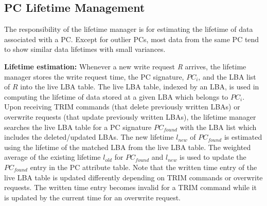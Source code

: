 

\vspace{-10pt}
\subsection{PC Lifetime Management}
\vspace{-5pt}
The responsibility of the lifetime manager is for estimating the lifetime of
data associated with a PC. 
{\color{blue}
Except for outlier PCs, most data from the same PC tend to show similar 
data lifetimes with small variances.
}

\textbf{Lifetime estimation:}
{\color{blue}
Whenever a new write request {\it R} arrives, 
the lifetime manager stores the write request time,
the PC signature, $PC_i$, and the LBA list of {$R$} into the live LBA table.
The live LBA table, indexed by an LBA, is used in computing the lifetime of data stored
at a given LBA which belongs to $PC_i$.
Upon receiving TRIM commands (that delete previously written LBAs)
or overwrite requests (that update previously
written LBAs), the lifetime manager searches the live LBA table for a PC
signature $PC_{found}$ with the LBA list which includes the deleted/updated LBAs.
The new lifetime $l_{new}$ of $PC_{found}$ is estimated using the lifetime 
of the matched LBA from the live LBA table. The weighted average of the existing
lifetime $l_{old}$ for $PC_{found}$ and $l_{new}$ is used to update the $PC_{found}$
entry in the PC attribute table.
Note that the written time entry of the live LBA table is updated differently 
depending on TRIM commands or overwrite requests.
The written time entry becomes invalid for a TRIM command while it is updated by 
the current time for an overwrite request.
}

